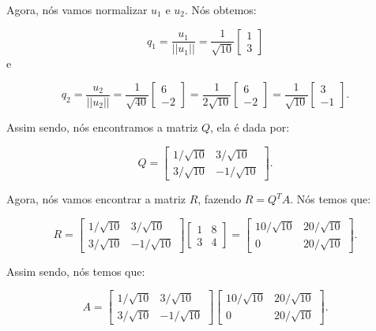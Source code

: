 \begin{Example}
	Agora, nós vamos normalizar $u_1$ e $u_2$. Nós obtemos:
	
	$$
	q_1 = \dfrac{u_1}{||u_1||} = \dfrac{1}{\sqrt{10}}\begin{bmatrix}
		1 \\
		3
	\end{bmatrix}
	$$
	e
	
	$$
	q_2 = \dfrac{u_2}{||u_2||} = \dfrac{1}{\sqrt{40}}\begin{bmatrix}
		6 \\
		-2
	\end{bmatrix} = \dfrac{1}{2\sqrt{10}}\begin{bmatrix}
		6 \\
		-2
	\end{bmatrix} = \dfrac{1}{\sqrt{10}}\begin{bmatrix}
		3 \\
		-1
	\end{bmatrix}.
	$$
	
	Assim sendo, nós encontramos a matriz $Q$, ela é dada por:
	
	$$
	Q = \begin{bmatrix}
		1/\sqrt{10} & 3/\sqrt{10} \\
		3/\sqrt{10} & -1/\sqrt{10}
	\end{bmatrix}.
	$$
	
	Agora, nós vamos encontrar a matriz $R$, fazendo $R = Q^TA$. Nós temos que:
	
	$$
	R = \begin{bmatrix}
		1/\sqrt{10} & 3/\sqrt{10} \\
		3/\sqrt{10} & -1/\sqrt{10}
	\end{bmatrix}\begin{bmatrix}
		1 & 8 \\
		3 & 4
	\end{bmatrix} = \begin{bmatrix}
		10/\sqrt{10} & 20/\sqrt{10} \\
		0 & 20/\sqrt{10}
	\end{bmatrix}.
	$$
	
	Assim sendo, nós temos que:
	
	$$
	A = \begin{bmatrix}
		1/\sqrt{10} & 3/\sqrt{10} \\
		3/\sqrt{10} & -1/\sqrt{10}
	\end{bmatrix}\begin{bmatrix}
		10/\sqrt{10} & 20/\sqrt{10} \\
		0 & 20/\sqrt{10}
	\end{bmatrix}.
	$$
\end{Example}

